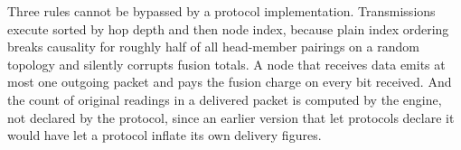 Three rules cannot be bypassed by a protocol implementation. Transmissions
execute sorted by hop depth and then node index, because plain index ordering
breaks causality for roughly half of all head-member pairings on a random
topology and silently corrupts fusion totals. A node that receives data emits at
most one outgoing packet and pays the fusion charge on every bit received. And
the count of original readings in a delivered packet is computed by the engine,
not declared by the protocol, since an earlier version that let protocols
declare it would have let a protocol inflate its own delivery figures.
